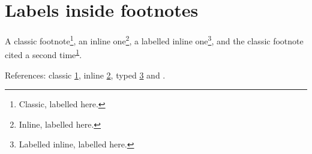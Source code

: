 \section{Labels inside footnotes}

A classic footnote\footnote{\label{jmdfn:a}Classic, labelled \label{fn-classic} here.}, an inline one\footnote{Inline, labelled \label{fn-inline} here.},
a labelled inline one\footnote{Labelled inline, labelled \label{fn-labelled} here.}, and
the classic footnote cited a second time\textsuperscript{\ref{jmdfn:a}}.

References: classic \ref{fn-classic}, inline \ref{fn-inline}, typed
\cref{fn-labelled} and .

